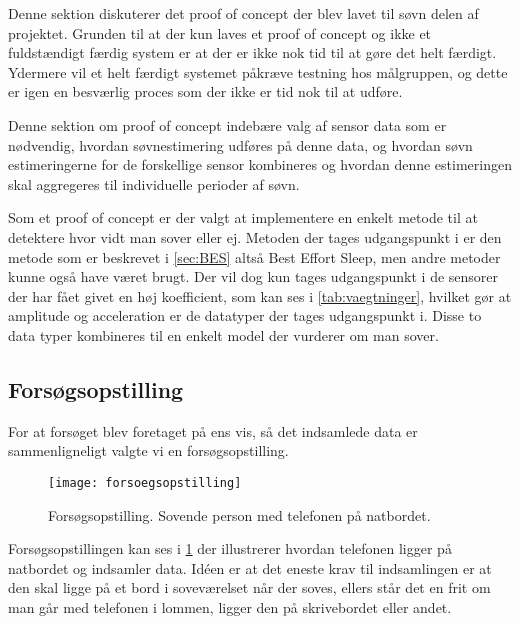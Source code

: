 Denne sektion diskuterer det proof of concept der blev lavet til søvn delen af projektet.
Grunden til at der kun laves et proof of concept og ikke et fuldstændigt færdig system er at der er ikke nok tid til at gøre det helt færdigt. 
Ydermere vil et helt færdigt systemet påkræve testning hos målgruppen, og dette er igen en besværlig proces som der ikke er tid nok til at udføre. 

Denne sektion om proof of concept indebære valg af sensor data som er nødvendig, hvordan søvnestimering udføres på denne data, og hvordan søvn estimeringerne for de forskellige sensor kombineres og hvordan denne estimeringen skal aggregeres til individuelle perioder af søvn.


Som et proof of concept er der valgt at implementere en enkelt metode til at detektere hvor vidt man sover eller ej.
Metoden der tages udgangspunkt i er den metode som er beskrevet i \cref{sec:BES} altså Best Effort Sleep, men andre metoder kunne også have været brugt.
Der vil dog kun tages udgangspunkt i de sensorer der har fået givet en høj koefficient, som kan ses i \cref{tab:vaegtninger}, hvilket gør at amplitude og acceleration er de datatyper der tages udgangspunkt i.
Disse to data typer kombineres til en enkelt model der vurderer om man sover.

\subsection{Forsøgsopstilling}
For at forsøget blev foretaget på ens vis, så det indsamlede data er sammenligneligt valgte vi en forsøgsopstilling.
\begin{figure}[h]
	\centering
	\texttt{[image: forsoegsopstilling]}
	\caption{Forsøgsopstilling. Sovende person med telefonen på natbordet.}
	\label{fig:forsoegopstillings}
\end{figure}

Forsøgsopstillingen kan ses i \cref{fig:forsoegopstillings} der illustrerer hvordan telefonen ligger på natbordet og indsamler data.
Idéen er at det eneste krav til indsamlingen er at den skal ligge på et bord i soveværelset når der soves, ellers står det en frit om man går med telefonen i lommen, ligger den på skrivebordet eller andet.

